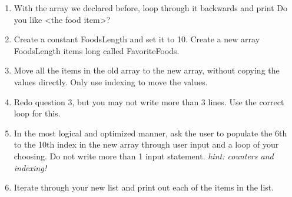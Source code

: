 \documentclass[./main.tex]{subfiles}
\begin{document}
\begin{enumerate}
    \item With the array we declared before, loop through it backwards and print {\ccmono Do you like <the food item>?}
        \mediumlines
    \item Create a constant {\ccmono FoodsLength} and set it to 10. Create a new array {\ccmono FoodsLength} items long called {\ccmono FavoriteFoods}.
        \mediumlines
    \item Move all the items in the old array to the new array, without copying the values directly. Only use indexing to move the values.
        \mediumlines
    \item Redo question 3, but you may not write more than 3 lines. Use the correct loop for this.
        \mediumlines
    \item In the most logical and optimized manner, ask the user to populate the 6th to the 10th index in the new array through user input and a loop of your choosing. Do not write more than 1 input statement. \emph{hint: counters and indexing!}
        \largelines
    \item Iterate through your new list and print out each of the items in the list. 
        \largelines
\end{enumerate}
\end{document}

